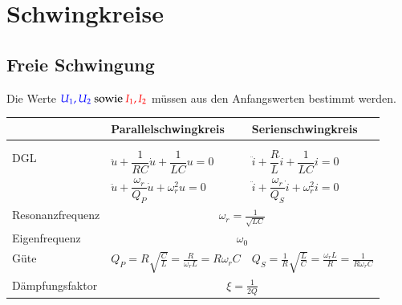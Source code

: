\section{Schwingkreise}
\subsection{Freie Schwingung}
Die Werte $\textcolor{blue}{U_1,U_2}\text{ sowie
}\textcolor{red}{I_1,I_2}$ müssen aus den Anfangswerten bestimmt
werden.\\
\renewcommand{\arraystretch}{2}
\begin{tabular}{| p{4cm} | p{7cm} | p{7cm} |}
	\hline
		& \textbf{Parallelschwingkreis} 
		& \textbf{Serienschwingkreis} \\
	\hline
	& & \\
	& 
	& \\
	\hline	
	DGL &
  $\ddot{u} + \dfrac{1}{RC} \dot{u} + \dfrac{1}{LC} u = 0$
  & $\ddot{i} + \dfrac{R}{L} \dot{i} + \dfrac{1}{LC} i = 0$\\
  & $\ddot{u} + \dfrac{\omega_r}{Q_P} \dot{u} + \omega_r^2 u = 0$
  & $\ddot{i} + \dfrac{\omega_r}{Q_S} \dot{i} + \omega_r^2 i = 0$\\
	\hline
	Resonanzfrequenz & \multicolumn{2}{|c|}{$\omega_r =
	\frac{1}{\sqrt{LC}}$} \\
	\hline
	Eigenfrequenz & \multicolumn{2}{|c|}{$\omega_0$} \\
	\hline
	Güte & 
	$Q_P = R\sqrt{\frac{C}{L}} = \frac{R}{\omega_r L}=R\omega_rC$ &
	$Q_S = \frac{1}{R}\sqrt{\frac{L}{C}} = \frac{\omega_r
	L}{R}=\frac{1}{R\omega_rC}$\\
	\hline
	Dämpfungsfaktor & \multicolumn{2}{|c|}{$\xi=\frac{1}{2Q}$} \\
	\hline
	

\end{tabular}
